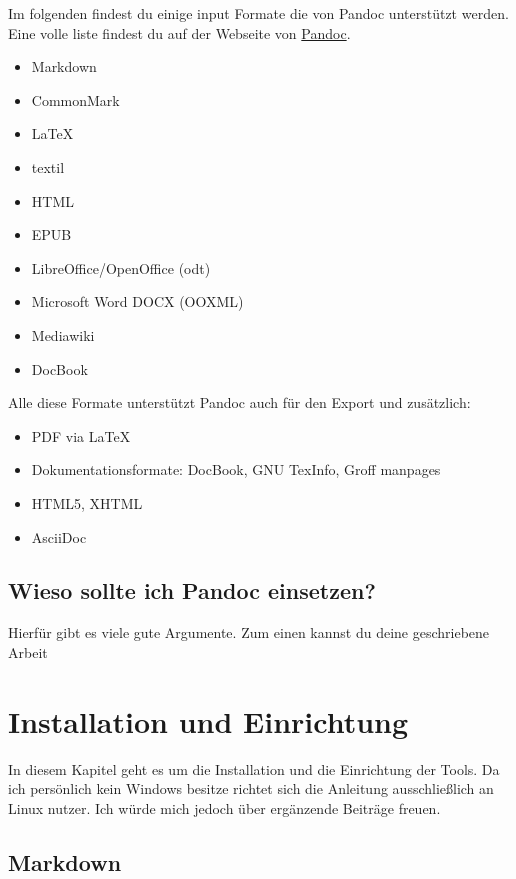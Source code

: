 \documentclass[
    12pt,
    a4paper,
            ngerman,
        bibliography=totocnumbered,
    listof=totocnumbered
]{scrartcl}
\providecommand{\tightlist}{%
  \setlength{\itemsep}{0pt}\setlength{\parskip}{0pt}}
\begin{document}
Im folgenden findest du einige input Formate die von Pandoc unterstützt
werden. Eine volle liste findest du auf der Webseite von
\href{http://pandoc.org/}{Pandoc}.

\begin{itemize}
\tightlist
\item
  Markdown
\item
  CommonMark
\item
  LaTeX
\item
  textil
\item
  HTML
\item
  EPUB
\item
  LibreOffice/OpenOffice (odt)
\item
  Microsoft Word DOCX (OOXML)
\item
  Mediawiki
\item
  DocBook
\end{itemize}

Alle diese Formate unterstützt Pandoc auch für den Export und
zusätzlich:

\begin{itemize}
\tightlist
\item
  PDF via LaTeX
\item
  Dokumentationsformate: DocBook, GNU TexInfo, Groff manpages
\item
  HTML5, XHTML
\item
  AsciiDoc
\end{itemize}

\hypertarget{wieso-sollte-ich-pandoc-einsetzen}{%
\subsection{Wieso sollte ich Pandoc
einsetzen?}\label{wieso-sollte-ich-pandoc-einsetzen}}

Hierfür gibt es viele gute Argumente. Zum einen kannst du deine
geschriebene Arbeit

\hypertarget{installation-und-einrichtung}{%
\section{Installation und
Einrichtung}\label{installation-und-einrichtung}}

In diesem Kapitel geht es um die Installation und die Einrichtung der
Tools. Da ich persönlich kein Windows besitze richtet sich die Anleitung
ausschließlich an Linux nutzer. Ich würde mich jedoch über ergänzende
Beiträge freuen.

\hypertarget{markdown}{%
\subsection{Markdown}\label{markdown}}
\end{document}

